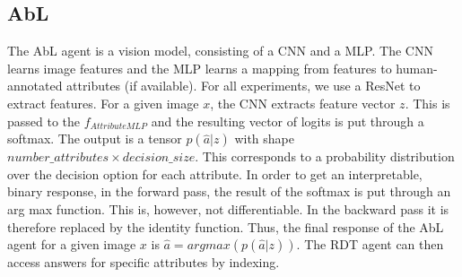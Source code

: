 \documentclass[a4paper,cleardoubleempty,BCOR1cm, 11pt]{report}
\begin{document}
\subsection{AbL}
The AbL agent is a vision model, consisting of a CNN and a MLP. The CNN learns image features and the MLP learns a mapping from features to human-annotated attributes (if available). For all experiments, we use a ResNet \cite{he2016deep} to extract features. For a given image $x$, the CNN extracts feature vector $z$. This is passed to the $f_{AttributeMLP}$ and the resulting vector of logits is put through a softmax. The output is a tensor $p(\hat{a}|z)$ with shape $number\_attributes \times decision\_size$. This corresponds to a probability distribution over the decision option for each attribute. In order to get an interpretable, binary response, in the forward pass, the result of the softmax is put through an arg max function. This is, however, not differentiable. In the backward pass it is therefore replaced by the identity function. Thus, the final response of the AbL agent for a given image $x$ is $\hat{a} = argmax(p(\hat{a}|z))$. The RDT agent can then access answers for specific attributes by indexing.
\end{document}
